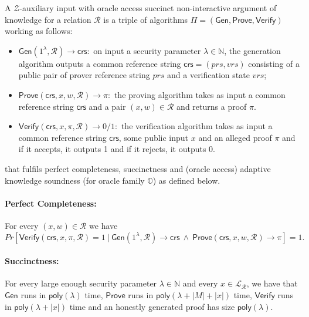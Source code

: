 \begin{definition}
\label{def:osnarks}
A $\mathcal{Z}$-auxiliary input with oracle access succinct non-interactive argument of knowledge for a relation $\mathcal{R}$ 
is a triple of algorithms $\Pi=(\mathsf{Gen}, \mathsf{Prove}, \mathsf{Verify})$ working as follows:
\begin{itemize}
\item $\mathsf{Gen}(1^{\lambda},\mathcal{R}) \rightarrow \mathsf{crs}:$ 
on input a security parameter $\lambda \in \mathbb{N}$, the generation algorithm outputs
a common reference string $\mathsf{crs} = (\mathit{prs},\mathit{vrs})$ 
consisting of a public pair of prover reference string $\mathit{prs}$ and a verification state $\mathit{vrs}$;
\item $\mathsf{Prove}(\mathsf{crs}, x, w, \mathcal{R}) \rightarrow \pi:$ the proving algorithm takes as input 
a common reference string $\mathsf{crs}$ and a pair $(x,w) \in \mathcal{R}$ and returns a proof $\pi$. 
\item $\mathsf{Verify}(\mathsf{crs}, x, \pi, \mathcal{R}) \rightarrow 0/1:$ the verification algorithm takes as input 
a common reference string $\mathsf{crs}$, some public input $x$ and an alleged proof $\pi$ and if it accepts, 
it outputs 1 and if it rejects, it outputs 0. 
\end{itemize}
\noindent that fulfils perfect completeness, succinctness and (oracle access) adaptive knowledge soundness (for oracle family $\mathbb{O}$) as defined below.

\paragraph{Perfect Completeness:} For every $(x,w) \in \mathcal{R}$ we have
$$\mathit{Pr}[ \mathsf{Verify}(\mathsf{crs}, x, \pi, \mathcal{R})=1 \  | \  \mathsf{Gen}(1^{\lambda},\mathcal{R}) \rightarrow \mathsf{crs} \ \wedge \  \mathsf{Prove}(\mathsf{crs}, x, w, \mathcal{R}) \rightarrow \pi ] = 1. $$

\paragraph{Succinctness:} For every large enough security parameter $\lambda \in \mathbb{N}$ 
and every $x \in \mathcal{L}_{\mathcal{R}}$, we have that 
$\mathsf{Gen}$ runs in $\mathsf{poly}(\lambda)$ time, $\mathsf{Prove}$ runs in $\mathsf{poly}(\lambda + |M|+ |x|)$ time,  
$\mathsf{Verify}$ runs in $\mathsf{poly}(\lambda + |x|)$ time and an honestly generated proof has size $\mathsf{poly}(\lambda)$. 

\end{definition}
